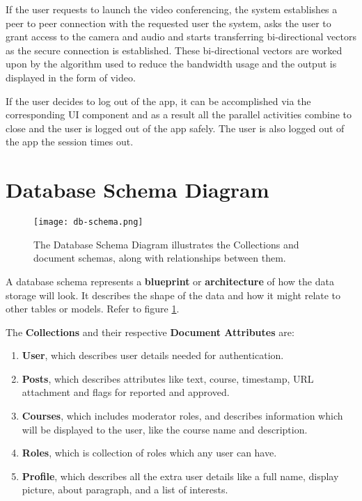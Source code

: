 If the user requests to launch the video conferencing, the system establishes a peer to peer connection with the requested user 
the system, asks the user to grant access to the camera and audio and starts transferring bi-directional vectors as the secure connection is established.
These bi-directional vectors are worked upon by the algorithm used to reduce the bandwidth usage and the output is displayed in the form of video.

If the user decides to log out of the app, it can be accomplished via the corresponding UI component and as a result all the 
parallel activities combine to close and the user is logged out of the app safely.
The user is also logged out of the app the session times out.

\section{Database Schema Diagram}

\begin{figure}[h!]
    \centering
    \texttt{[image: db-schema.png]}
    \caption{The Database Schema Diagram illustrates the Collections and document schemas, 
    along with relationships between them.}
    \label{fig:schema}
\end{figure}

A database schema represents a \textbf{blueprint} or \textbf{architecture} of how the data storage will look. 
It describes the shape of the data and how it might relate to other tables or models. Refer to figure \ref{fig:schema}.

The \textbf{Collections} and their respective \textbf{Document Attributes} are:
\begin{enumerate}
    \item \textbf{User}, which describes user details needed for authentication.
    \item \textbf{Posts}, which describes attributes like text, course, timestamp, URL attachment 
    and flags for reported and approved.
    \item \textbf{Courses}, which includes moderator roles, and describes information which will 
    be displayed to the user, like the course name and description.
    \item \textbf{Roles}, which is collection of roles which any user can have.
    \item \textbf{Profile}, which describes all the extra user details like a full name, display picture, about paragraph, and a list of interests.
\end{enumerate}

